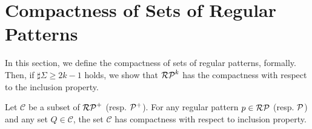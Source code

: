 \section{Compactness of Sets of Regular Patterns}

In this section, we define the compactness of sets of regular patterns, formally.
Then, if $\sharp\Sigma \ge 2k-1$ holds, 
we show that 
$\mathcal{RP}^{k}$ has the compactness with respect to the inclusion property.

\begin{dfn}
Let $\mathcal{C}$ be a subset of $\mathcal{RP}^{+}$ (resp. $\mathcal{P}^{+}$). 
For any regular pattern $p \in \mathcal{RP}$ (resp. $\mathcal{P}$) and any set $Q \in \mathcal{C}$,
the set $\mathcal{C}$ has compactness with respect to inclusion property.
\end{dfn}


